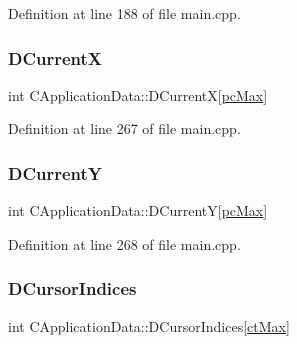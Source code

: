 Definition at line 188 of file main.\+cpp.

\hypertarget{classCApplicationData_a1dc7ee482a39f7978c71365ac540f97a}{}\label{classCApplicationData_a1dc7ee482a39f7978c71365ac540f97a} 
\subsubsection{\texorpdfstring{D\+CurrentX}{DCurrentX}}
{\footnotesize\ttfamily int C\+Application\+Data\+::\+D\+CurrentX\mbox{[}\hyperlink{GameDataTypes_8h_aafb0ca75933357ff28a6d7efbdd7602fa594a5c8dd3987f24e8a0f23f1a72cd34}{pc\+Max}\mbox{]}\hspace{0.3cm}{\ttfamily [protected]}}



Definition at line 267 of file main.\+cpp.

\hypertarget{classCApplicationData_a0ba39779ae11c8072258c6ddfebd6052}{}\label{classCApplicationData_a0ba39779ae11c8072258c6ddfebd6052} 
\subsubsection{\texorpdfstring{D\+CurrentY}{DCurrentY}}
{\footnotesize\ttfamily int C\+Application\+Data\+::\+D\+CurrentY\mbox{[}\hyperlink{GameDataTypes_8h_aafb0ca75933357ff28a6d7efbdd7602fa594a5c8dd3987f24e8a0f23f1a72cd34}{pc\+Max}\mbox{]}\hspace{0.3cm}{\ttfamily [protected]}}



Definition at line 268 of file main.\+cpp.

\hypertarget{classCApplicationData_a3f4e69d928f933bba6e1c388c5a720a2}{}\label{classCApplicationData_a3f4e69d928f933bba6e1c388c5a720a2} 
\subsubsection{\texorpdfstring{D\+Cursor\+Indices}{DCursorIndices}}
{\footnotesize\ttfamily int C\+Application\+Data\+::\+D\+Cursor\+Indices\mbox{[}\hyperlink{classCApplicationData_ad024b66b60017c45c47a85dbc636ae69a57f089bfb5f201e4f592dd2e41888a44}{ct\+Max}\mbox{]}\hspace{0.3cm}{\ttfamily [protected]}}



